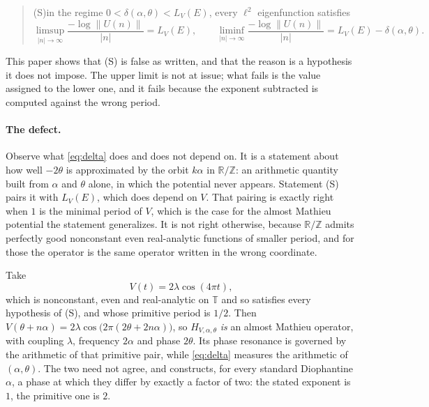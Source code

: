 \documentclass[11pt,reqno]{amsart}
\theoremstyle{plain}
\theoremstyle{definition}
\theoremstyle{remark}
\numberwithin{equation}{section}
\begin{document}
\begin{quote}
  (S)\quad in the regime $0<\delta(\alpha,\theta)<L_V(E)$, every $\ell^2$
  eigenfunction satisfies
  \begin{equation*}
    \limsup_{|n|\to\infty}\frac{-\log\lVert U(n)\rVert}{|n|}=L_V(E),
    \qquad
    \liminf_{|n|\to\infty}\frac{-\log\lVert U(n)\rVert}{|n|}
      =L_V(E)-\delta(\alpha,\theta).
  \end{equation*}
\end{quote}

This paper shows that (S) is false as written, and that the reason is a
hypothesis it does not impose. The upper limit is not at issue; what fails is
the value assigned to the lower one, and it fails because the exponent
subtracted is computed against the wrong period.

\paragraph{The defect.} Observe what \eqref{eq:delta} does and does not
depend on. It is a statement about how well $-2\theta$ is approximated by the
orbit $k\alpha$ in $\mathbb R/\mathbb Z$: an arithmetic quantity built from
$\alpha$ and $\theta$ alone, in which the potential never appears. Statement
(S) pairs it with $L_V(E)$, which does depend on $V$. That pairing is exactly
right when $1$ is the minimal period of $V$, which is the case for the almost
Mathieu potential the statement generalizes. It is not right otherwise,
because $\mathbb R/\mathbb Z$ admits perfectly good nonconstant even
real-analytic functions of smaller period, and for those the operator is the
same operator written in the wrong coordinate.

Take
\begin{equation}
  \label{eq:V}
  V(t)=2\lambda\cos(4\pi t),
\end{equation}
which is nonconstant, even and real-analytic on $\mathbb T$ and so satisfies
every hypothesis of (S), and whose primitive period is $1/2$. Then
$V(\theta+n\alpha)=2\lambda\cos\bigl(2\pi(2\theta+2n\alpha)\bigr)$, so
$H_{V,\alpha,\theta}$ \emph{is} an almost Mathieu operator, with coupling
$\lambda$, frequency $2\alpha$ and phase $2\theta$. Its phase resonance is
governed by the arithmetic of that primitive pair, while \eqref{eq:delta}
measures the arithmetic of $(\alpha,\theta)$. The two need not agree, and
 constructs, for every standard Diophantine $\alpha$, a
phase at which they differ by exactly a factor of two: the stated exponent is
$1$, the primitive one is $2$.
\end{document}
